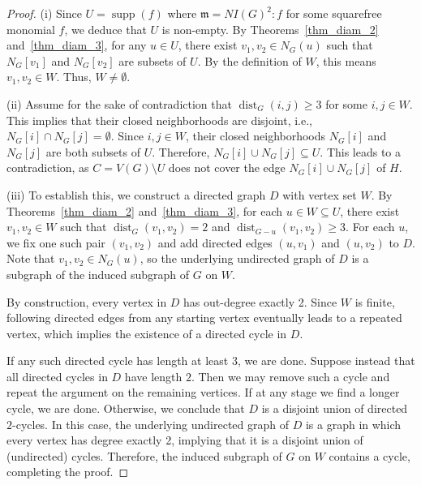 \documentclass[12pt,reqno,twoside]{amsart}
\newcommand{\mm}{\mathfrak m}
\DeclareMathOperator{\dist}{dist}
\DeclareMathOperator{\supp}{supp}
\theoremstyle{definition}
\theoremstyle{plain}
\theoremstyle{remark}
\numberwithin{equation}{section}
\begin{document}
\begin{proof}
(i) Since $U = \supp (f)$ where $\mm = NI(G)^2 : f$ for some squarefree monomial $f$, we deduce that $U$ is non-empty. By Theorems~\ref{thm_diam_2} and~\ref{thm_diam_3}, for any $u \in U$, there exist $v_1, v_2 \in N_G(u)$ such that $N_G[v_1]$ and $N_G[v_2]$ are subsets of $U$. By the definition of $W$, this means $v_1, v_2 \in W$. Thus, $W \neq \emptyset$.

\vspace{1em} %

(ii) Assume for the sake of contradiction that $\dist_G(i,j) \ge 3$ for some $i,j \in W$. This implies that their closed neighborhoods are disjoint, i.e., $N_G[i] \cap N_G[j] = \emptyset$. Since $i,j \in W$, their closed neighborhoods $N_G[i]$ and $N_G[j]$ are both subsets of $U$. Therefore, $N_G[i] \cup N_G[j] \subseteq U$. This leads to a contradiction, as $C = V(G) \setminus U$ does not cover the edge $N_G[i] \cup N_G[j]$ of $H$.

\vspace{1em}

(iii) To establish this, we construct a directed graph $D$ with vertex set $W$. By Theorems~\ref{thm_diam_2} and~\ref{thm_diam_3}, for each $u \in W \subseteq U$, there exist $v_1, v_2 \in W$ such that $\dist_G(v_1, v_2) = 2$ and $\dist_{G - u}(v_1, v_2) \geq 3$. For each $u$, we fix one such pair $(v_1, v_2)$ and add directed edges $(u, v_1)$ and $(u, v_2)$ to $D$. Note that $v_1, v_2 \in N_G(u)$, so the underlying undirected graph of $D$ is a subgraph of the induced subgraph of $G$ on $W$.

By construction, every vertex in $D$ has out-degree exactly 2. Since $W$ is finite, following directed edges from any starting vertex eventually leads to a repeated vertex, which implies the existence of a directed cycle in $D$.

If any such directed cycle has length at least $3$, we are done. Suppose instead that all directed cycles in $D$ have length $2$. Then we may remove such a cycle and repeat the argument on the remaining vertices. If at any stage we find a longer cycle, we are done. Otherwise, we conclude that $D$ is a disjoint union of directed $2$-cycles. In this case, the underlying undirected graph of $D$ is a graph in which every vertex has degree exactly 2, implying that it is a disjoint union of (undirected) cycles. Therefore, the induced subgraph of $G$ on $W$ contains a cycle, completing the proof.
\end{proof}
\end{document}

